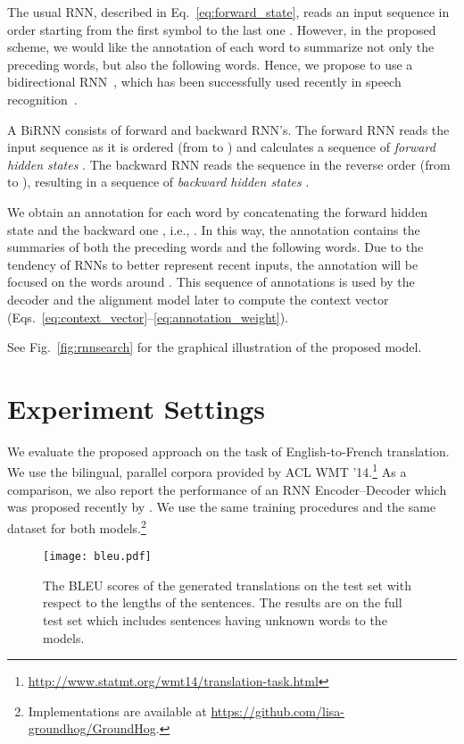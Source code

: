 The usual RNN, described in Eq.~\eqref{eq:forward_state}, reads an input
sequence  in order starting from the first symbol  to the last one
. However, in the proposed scheme, we would like the annotation of each
word to summarize not only the preceding words, but also the following words.
Hence, we propose to use a bidirectional RNN~\citep[BiRNN, ][]{Schuster1997},
which has been successfully used recently in speech recognition~\citep[see,
e.g.,][]{Graves2013asru}. 

A BiRNN consists of forward and backward RNN's. The forward RNN  reads
the input sequence as it is ordered (from  to ) and calculates a
sequence of {\it forward hidden states} .
The backward RNN  reads the sequence in the reverse order (from
 to ), resulting in a sequence of {\it backward hidden states} . 

We obtain an annotation for each word  by concatenating the forward hidden
state  and the backward one , i.e., . In this way, the annotation 
contains the summaries of both the preceding words and the following words. Due
to the tendency of RNNs to better represent recent inputs, the annotation 
will be focused on the words around . This sequence of annotations is used
by the decoder and the alignment model later to compute the context vector
(Eqs.~\eqref{eq:context_vector}--\eqref{eq:annotation_weight}).

See Fig.~\ref{fig:rnnsearch} for the graphical illustration of the proposed
model.

\section{Experiment Settings}
\label{sec:exp_settings}

We evaluate the proposed approach on the task of English-to-French translation.
We use the bilingual, parallel corpora provided by ACL WMT '14.\footnote{
    \url{http://www.statmt.org/wmt14/translation-task.html}
} As a comparison, we also report the performance of an RNN Encoder--Decoder
which was proposed recently by \citet{Cho2014}. We use the same training
procedures and the same dataset for both models.\footnote{
    Implementations are available at \url{https://github.com/lisa-groundhog/GroundHog}.
}

\begin{figure}[t]
    \centering
    \begin{minipage}{0.7\textwidth}
        \texttt{[image: bleu.pdf]}
    \end{minipage}
    \hfill
    \begin{minipage}[t!]{0.29\textwidth}
        \caption{
            The BLEU scores of the generated translations on the test set with
            respect to the lengths of the sentences. The results are on the full
            test set which includes sentences having unknown words to the
            models.
        }
        \label{fig:bleu_length}
    \end{minipage}
\end{figure}


